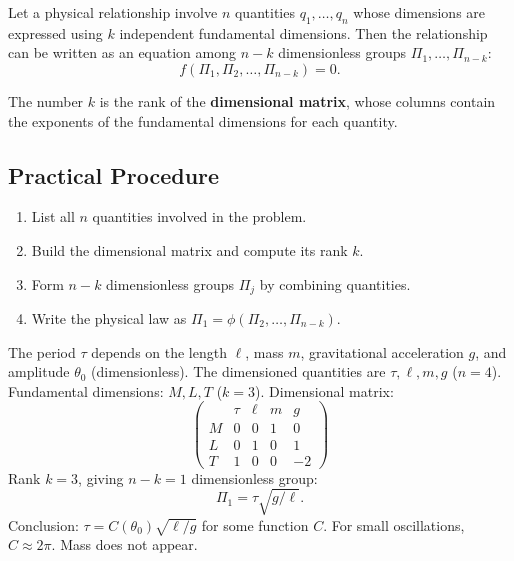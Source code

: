 \begin{theorem}[Buckingham $\Pi$]
Let a physical relationship involve $n$ quantities $q_1,\ldots,q_n$
whose dimensions are expressed using $k$ independent fundamental
dimensions.  Then the relationship can be written as an equation among
$n-k$ dimensionless groups $\Pi_1,\ldots,\Pi_{n-k}$:
\[
  f(\Pi_1, \Pi_2, \ldots, \Pi_{n-k}) = 0.
\]
\end{theorem}

\begin{remark}
The number $k$ is the rank of the \textbf{dimensional matrix}, whose
columns contain the exponents of the fundamental dimensions for each
quantity.
\end{remark}

\subsection{Practical Procedure}

\begin{enumerate}
  \item List all $n$ quantities involved in the problem.
  \item Build the dimensional matrix and compute its rank $k$.
  \item Form $n-k$ dimensionless groups $\Pi_j$ by combining quantities.
  \item Write the physical law as
        $\Pi_1 = \phi(\Pi_2,\ldots,\Pi_{n-k})$.
\end{enumerate}

\begin{example}
The period $\tau$ depends on the length $\ell$, mass $m$,
gravitational acceleration $g$, and amplitude $\theta_0$
(dimensionless).  The dimensioned quantities are $\tau, \ell, m, g$
($n=4$).  Fundamental dimensions: $M, L, T$ ($k=3$).  Dimensional
matrix:
\[
  \begin{pmatrix}
    & \tau & \ell & m & g \\
    M & 0 & 0 & 1 & 0 \\
    L & 0 & 1 & 0 & 1 \\
    T & 1 & 0 & 0 & -2
  \end{pmatrix}
\]
Rank $k=3$, giving $n-k=1$ dimensionless group:
\[
  \Pi_1 = \tau \sqrt{g/\ell}.
\]
Conclusion: $\tau = C(\theta_0)\sqrt{\ell/g}$ for some function $C$.
For small oscillations, $C\approx 2\pi$.  Mass does not appear.
\end{example}

